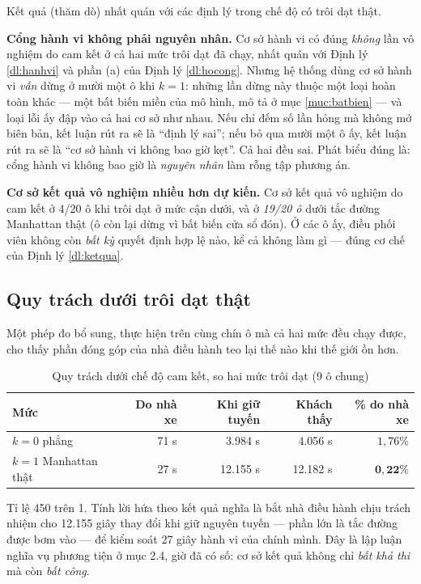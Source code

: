 Kết quả (thăm dò) nhất quán với các định lý trong chế độ có trôi dạt thật.

\textbf{Cổng hành vi không phải nguyên nhân.} Cơ sở hành vi có đúng \emph{không} lần vô nghiệm do
cam kết ở cả hai mức trôi dạt đã chạy, nhất quán với Định lý \ref{dl:hanhvi} và phần (a) của Định
lý \ref{dl:hocong}. Nhưng hệ thống dùng cơ sở hành vi \emph{vẫn} dừng ở mười một ô khi $k=1$: những
lần dừng này thuộc một loại hoàn toàn khác --- một bất biến miền của mô hình, mô tả ở mục
\ref{muc:batbien} --- và loại lỗi ấy đập vào cả hai cơ sở như nhau. Nếu chỉ đếm số lần hỏng mà
không mở biên bản, kết luận rút ra sẽ là ``định lý sai''; nếu bỏ qua mười một ô ấy, kết luận rút
ra sẽ là ``cơ sở hành vi không bao giờ kẹt''. Cả hai đều sai. Phát biểu đúng là: cổng hành vi
không bao giờ là \emph{nguyên nhân} làm rỗng tập phương án.

\textbf{Cơ sở kết quả vô nghiệm nhiều hơn dự kiến.} Cơ sở kết quả vô nghiệm do cam kết ở 4/20 ô
khi trôi dạt ở mức cận dưới, và ở \emph{19/20 ô} dưới tắc đường Manhattan thật (ô còn lại dừng vì
bất biến cửa sổ đón). Ở các ô ấy, điều phối viên không còn \emph{bất kỳ} quyết định hợp lệ nào,
kể cả không làm gì --- đúng cơ chế của Định lý \ref{dl:ketqua}.

\subsection{Quy trách dưới trôi dạt thật}

Một phép đo bổ sung, thực hiện trên cùng chín ô mà cả hai mức đều chạy được, cho thấy phần đóng
góp của nhà điều hành teo lại thế nào khi thế giới ồn hơn.

\begin{table}[htbp]
\centering
\caption{Quy trách dưới chế độ cam kết, so hai mức trôi dạt (9 ô chung)}
\label{bang:quytrach-troidat}
\small
\begin{tabular}{@{}lrrrr@{}}
\toprule
\textbf{Mức} & \textbf{Do nhà xe} & \textbf{Khi giữ tuyến} & \textbf{Khách thấy} & \textbf{\% do nhà xe}\\
\midrule
$k=0$ phẳng & 71 s & 3.984 s & 4.056 s & $1{,}76\%$\\
$k=1$ Manhattan thật & 27 s & 12.155 s & 12.182 s & $\mathbf{0{,}22\%}$\\
\bottomrule
\end{tabular}
\end{table}

Tỉ lệ 450 trên 1. Tính lời hứa theo kết quả nghĩa là bắt nhà điều hành chịu trách nhiệm cho
12.155 giây thay đổi khi giữ nguyên tuyến --- phần lớn là tắc đường được bơm vào --- để kiểm soát
27 giây hành vi của chính mình. Đây là lập luận nghĩa vụ
phương tiện ở mục 2.4, giờ đã có số: cơ sở kết quả không chỉ \emph{bất khả thi} mà còn
\emph{bất công}.

